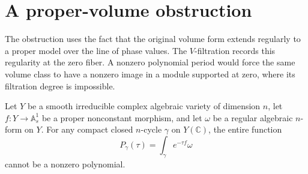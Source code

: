 \section{A proper-volume obstruction}\label{sec:proper-volume}

The obstruction uses the fact that the original volume form extends
regularly to a proper model over the line of phase values. The
\(V\)-filtration records this regularity at the zero fiber. A nonzero
polynomial period would force the same volume class to have a nonzero
image in a module supported at zero, where its filtration degree is
impossible.

\begin{lemma}\label{lem:proper-volume}
Let \(Y\) be a smooth irreducible complex algebraic variety of dimension
\(n\), let \(f:Y\to\mathbb A^1_s\) be a proper nonconstant morphism, and
let \(\omega\) be a regular algebraic \(n\)-form on \(Y\). For any compact
closed \(n\)-cycle \(\gamma\) on \(Y(\mathbb C)\), the entire function
\[
 P_\gamma(\tau)=\int_\gamma e^{-\tau f}\omega
\]
cannot be a nonzero polynomial.
\end{lemma}

